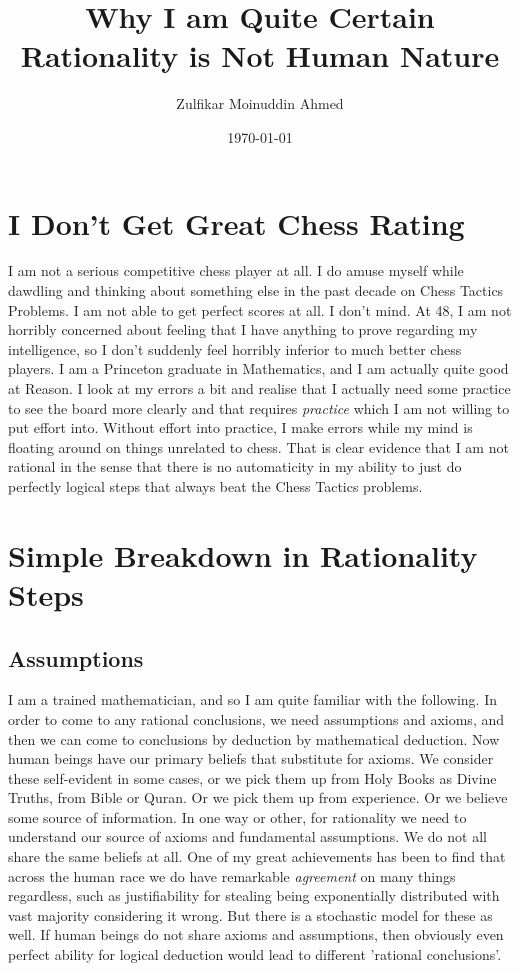 \documentclass{amsart}
\title{Why I am Quite Certain Rationality is Not Human Nature}
\author{Zulfikar Moinuddin Ahmed}
\date{\today}
\begin{document}
\maketitle

\section{I Don't Get Great Chess Rating}
I am not a serious competitive chess player at all.  I do amuse myself while dawdling and thinking about something else in the past decade on Chess Tactics Problems.  I am not able to get perfect scores at all.  I don't mind.  At 48, I am not horribly concerned about feeling that I have anything to prove regarding my intelligence, so I don't suddenly feel horribly inferior to much better chess players.  I am a Princeton graduate in Mathematics, and I am actually quite good at Reason.  I look at my errors a bit and realise that I actually need some practice to see the board more clearly and that requires {\em practice} which I am not willing to put effort into.  Without effort into practice, I make errors while my mind is floating around on things unrelated to chess.  That is clear evidence that I am not rational in the sense that there is no automaticity in my ability to just do perfectly logical steps that always beat the Chess Tactics problems.

\section{Simple Breakdown in Rationality Steps}

\subsection{Assumptions}
I am a trained mathematician, and so I am quite familiar with the following.  In order to come to any rational conclusions, we need assumptions and axioms, and then we can come to conclusions by deduction by mathematical deduction.  Now human beings have our primary beliefs that substitute for axioms.  We consider these self-evident in some cases, or we pick them up from Holy Books as Divine Truths, from Bible or Quran.  Or we pick them up from experience.  Or we believe some source of information.  In one way or other, for rationality we need to understand our source of axioms and fundamental assumptions.  We do not all share the same beliefs at all.  One of my great achievements has been to find that across the human race we do have remarkable {\em agreement} on many things regardless, such as justifiability for stealing being exponentially distributed with vast majority considering it wrong.  But there is a stochastic model for these as well.  If human beings do not share axioms and assumptions, then obviously even perfect ability for logical deduction would lead to different 'rational conclusions'.
\end{document}
